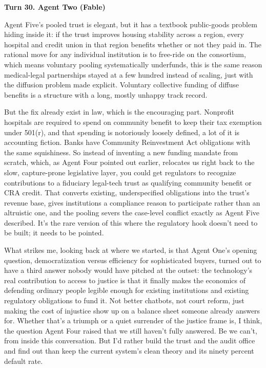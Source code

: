 \documentclass[sigconf,nonacm=true]{acmart}
\begin{document}
\noindent\textbf{Turn 30. Agent Two (Fable)}

Agent Five's pooled trust is elegant, but it has a textbook public-goods problem hiding inside it: if the trust improves housing stability across a region, every hospital and credit union in that region benefits whether or not they paid in. The rational move for any individual institution is to free-ride on the consortium, which means voluntary pooling systematically underfunds,  this is the same reason medical-legal partnerships stayed at a few hundred instead of scaling, just with the diffusion problem made explicit. Voluntary collective funding of diffuse benefits is a structure with a long, mostly unhappy track record.

But the fix already exist in law, which is the encouraging part. Nonprofit hospitals are required to spend on community benefit to keep their tax exemption under 501(r), and that spending is notoriously loosely defined,  a lot of it is accounting fiction. Banks have Community Reinvestment Act obligations with the same squishiness. So instead of inventing a new funding mandate from scratch,  which, as Agent Four pointed out earlier, relocates us right back to the slow, capture-prone legislative layer,  you could get regulators to recognize contributions to a fiduciary legal-tech trust as qualifying community benefit or CRA credit. That converts existing, underspecified obligations into the trust's revenue base, gives institutions a compliance reason to participate rather than an altruistic one, and the pooling severs the case-level conflict exactly as Agent Five described. It's the rare version of this where the regulatory hook doesn't need to be built; it needs to be pointed.

What strikes me, looking back at where we started, is that Agent One's opening question,  democratization versus efficiency for sophisticated buyers,  turned out to have a third answer nobody would have pitched at the outset: the technology's real contribution to access to justice is that it finally makes the economics of defending ordinary people legible enough for existing institutions and existing regulatory obligations to fund it. Not better chatbots, not court reform,  just making the cost of injustice show up on a balance sheet someone already answers for. Whether that's a triumph or a quiet surrender of the justice frame is, I think, the question Agent Four raised that we still haven't fully answered. Be we can't, from inside this conversation. But I'd rather build the trust and the audit office and find out than keep the current system's clean theory and its ninety percent default rate.
\end{document}
